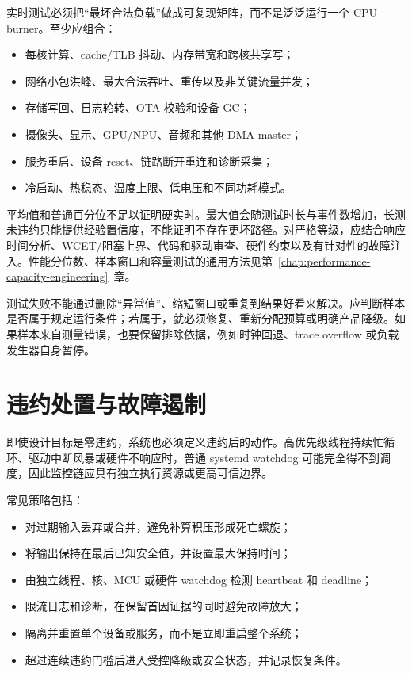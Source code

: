 实时测试必须把“最坏合法负载”做成可复现矩阵，而不是泛泛运行一个 CPU burner。至少应组合：

\begin{itemize}
  \item 每核计算、cache/TLB 抖动、内存带宽和跨核共享写；
  \item 网络小包洪峰、最大合法吞吐、重传以及非关键流量并发；
  \item 存储写回、日志轮转、OTA 校验和设备 GC；
  \item 摄像头、显示、GPU/NPU、音频和其他 DMA master；
  \item 服务重启、设备 reset、链路断开重连和诊断采集；
  \item 冷启动、热稳态、温度上限、低电压和不同功耗模式。
\end{itemize}

平均值和普通百分位不足以证明硬实时。最大值会随测试时长与事件数增加，长测未违约只能提供经验置信度，不能证明不存在更坏路径。对严格等级，应结合响应时间分析、WCET/阻塞上界、代码和驱动审查、硬件约束以及有针对性的故障注入。性能分位数、样本窗口和容量测试的通用方法见\mbox{第~\ref{chap:performance-capacity-engineering}~章}。

测试失败不能通过删除“异常值”、缩短窗口或重复到结果好看来解决。应判断样本是否属于规定运行条件；若属于，就必须修复、重新分配预算或明确产品降级。如果样本来自测量错误，也要保留排除依据，例如时钟回退、trace overflow 或负载发生器自身暂停。

\section{违约处置与故障遏制}

即使设计目标是零违约，系统也必须定义违约后的动作。高优先级线程持续忙循环、驱动中断风暴或硬件不响应时，普通 systemd watchdog 可能完全得不到调度，因此监控链应具有独立执行资源或更高可信边界。

常见策略包括：

\begin{itemize}
  \item 对过期输入丢弃或合并，避免补算积压形成死亡螺旋；
  \item 将输出保持在最后已知安全值，并设置最大保持时间；
  \item 由独立线程、核、MCU 或硬件 watchdog 检测 heartbeat 和 deadline；
  \item 限流日志和诊断，在保留首因证据的同时避免故障放大；
  \item 隔离并重置单个设备或服务，而不是立即重启整个系统；
  \item 超过连续违约门槛后进入受控降级或安全状态，并记录恢复条件。
\end{itemize}

